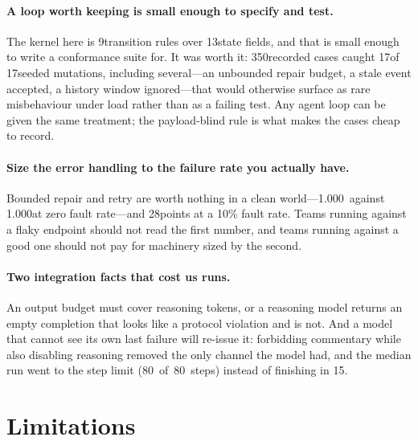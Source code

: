 \documentclass[11pt,a4paper]{article}
\begin{document}
\paragraph{A loop worth keeping is small enough to specify and test.}
The kernel here is 9transition rules over 13state fields,
and that is small enough to write a conformance suite for. It was worth it:
350recorded cases caught 17of 17seeded mutations,
including several---an unbounded repair budget, a stale event accepted, a
history window ignored---that would otherwise surface as rare misbehaviour
under load rather than as a failing test. Any agent loop can be given the same
treatment; the payload-blind rule is what makes the cases cheap to record.

\paragraph{Size the error handling to the failure rate you actually have.}
Bounded repair and retry are worth nothing in a clean world---1.000\
against 1.000at zero fault rate---and 28points at a 10\%
fault rate. Teams running against a flaky endpoint should not read the first
number, and teams running against a good one should not pay for machinery
sized by the second.

\paragraph{Two integration facts that cost us runs.}
An output budget must cover reasoning tokens, or a reasoning model returns an
empty completion that looks like a protocol violation and is not. And a model
that cannot see its own last failure will re-issue it: forbidding commentary
while also disabling reasoning removed the only channel the model had, and the
median run went to the step limit \mbox{(80 of 80 steps)} instead of finishing
in 15.

\section{Limitations}
\end{document}
